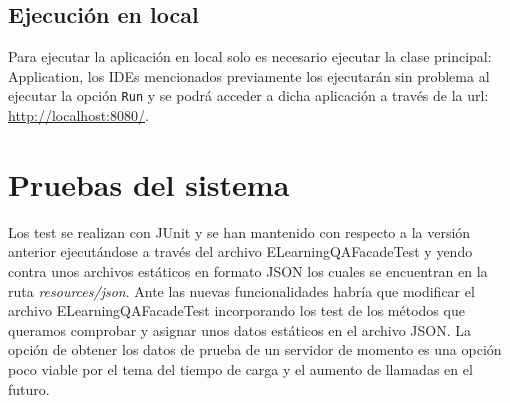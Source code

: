 \subsection{Ejecución en local}
Para ejecutar la aplicación en local solo es necesario ejecutar la clase principal: Application, los IDEs mencionados previamente los ejecutarán sin problema al ejecutar la opción \texttt{Run} y se podrá acceder a dicha aplicación a través de la url: \url{http://localhost:8080/}.

\section{Pruebas del sistema}
Los test se realizan con JUnit y se han mantenido con respecto a la versión anterior ejecutándose a través del archivo ELearningQAFacadeTest y yendo contra unos archivos estáticos en formato JSON los cuales se encuentran en la ruta \textit{resources/json}. Ante las nuevas funcionalidades habría que modificar el archivo ELearningQAFacadeTest incorporando los test de los métodos que queramos comprobar y asignar unos datos estáticos en el archivo JSON. La opción de obtener los datos de prueba de un servidor de momento es una opción poco viable por el tema del tiempo de carga y el aumento de llamadas en el futuro.